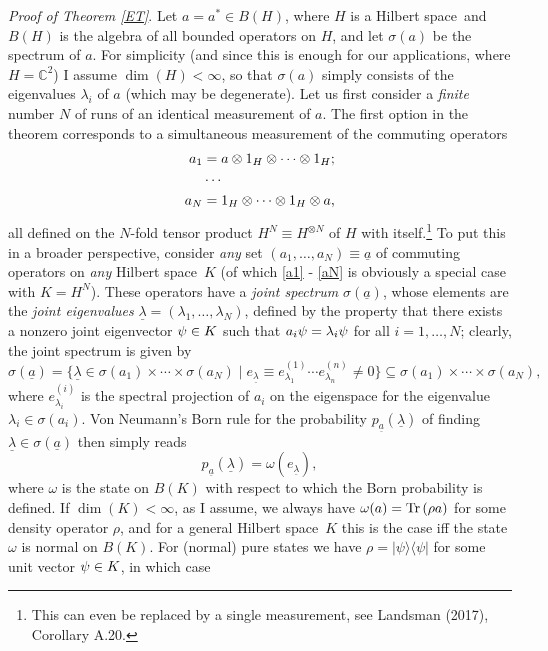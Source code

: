 \documentclass[11pt,a4paper]{article}
\numberwithin{equation}{section}
\newcommand{\er}{\eqref}
\newcommand{\ul}{\underline}
\newcommand{\ot}{\otimes}
\newcommand{\la}{\langle} \newcommand{\ra}{\rangle}
\newcommand{\x}{\times}
\newcommand{\Hs}{Hilbert space} \newcommand{\Bs}{Banach space}
\newcommand{\lm}{\lambda} \newcommand{\Lm}{\Lambda}
\newcommand{\rh}{\rho} \newcommand{\sg}{\sigma}
\newcommand{\om}{\omega} \newcommand{\Om}{\Omega}
\newcommand{\Tr}{\mbox{\rm Tr}\,}
\newcommand{\C}{{\mathbb C}}
\begin{document}
  \emph{Proof of Theorem \ref{ET}}.
Let $a=a^*\in B(H)$, where $H$ is a \Hs\  and $B(H)$ is the algebra of all bounded operators on $H$, and let $\sg(a)$ be the spectrum of $a$. For simplicity (and since this is enough for our applications, where $H=\C^2$) I assume $\dim(H)<\infty$, so that $\sg(a)$ simply consists of the eigenvalues $\lm_i$ of $a$ (which may be degenerate). Let us first consider a \emph{finite} number $N$ of runs of an identical measurement of $a$.
The first option in the theorem corresponds to a simultaneous measurement of the commuting operators 
\begin{align}
a_1&=a\ot 1_H\ot\cdots\ot 1_H; \label{a1} \\
& \cdots \nn \\
a_N &=1_H\ot\cdots\ot 1_H\ot a, \label{aN}
\end{align}
all defined on the $N$-fold tensor product $H^N\equiv H^{\ot N}$ of $H$ with itself.\footnote{This can even be replaced by a single measurement, see Landsman (2017), Corollary A.20.}  To put this in a broader perspective,  consider \emph{any} set $(a_1, \ldots, a_N)\equiv\ul{a}$ of commuting operators on \emph{any} \Hs\ $K$ (of which \er{a1} - \er{aN} is obviously a special case with $K=H^N$).
These operators have a \emph{joint spectrum} $\sg(\ul{a})$, whose elements are the \emph{joint eigenvalues} $\ul{\lm}=(\lm_1, \ldots, \lm_N)$, defined by the property that there exists a nonzero joint eigenvector $\psi\in K$ such that $a_i\ps=\lm_i\ps$ for all $i=1, \ldots, N$; clearly, the joint spectrum is given by
\begin{equation}
\sg(\ul{a})=\{\ul{\lm}\in
\sg(a_1)\x\cdots\x\sg(a_N)\mid e_{\ul{\lm}}\equiv e^{(1)}_{\lm_1}\cdots e^{(n)}_{\lm_n} \neq 0\} \subseteq \sg(a_1)\x\cdots\x\sg(a_N), \label{21}
\end{equation}
where $e^{(i)}_{\lm_i}$ is the spectral projection of $a_i$ on the eigenspace for the eigenvalue $\lm_i\in\sg(a_i)$.
Von Neumann's Born rule for the probability $p_{\ul{a}}(\ul{\lm})$ of finding $\ul{\lm}\in\sg(\ul{a})$ then simply reads 
\begin{equation}
p_{\ul{a}}(\ul{\lm})=\om(e_{\ul{\lm}}),\label{paQn}
\end{equation}
 where $\om$ is the state on $B(K)$ with respect to which the Born probability is defined. If $\dim(K)<\infty$, as I assume, we always have $\om(a)=\Tr(\rh a)$ for some density operator $\rh$, and for a  general \Hs\ $K$ this is the case iff the state $\om$ is normal on $B(K)$. For (normal) pure states we have $\rh=|\psi\ra\la\psi|$ for some unit vector $\psi\in K$, in which case
\end{document}

